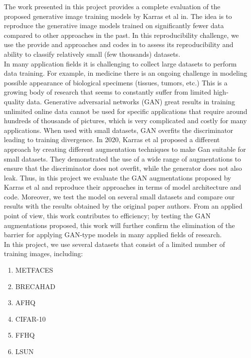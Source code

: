\documentclass{report}
\begin{document}
The work presented in this project provides a complete evaluation of the proposed generative image training models by Karras et al in\cite{karras2020training}. The idea is to reproduce the generative image models trained on significantly fewer data compared to other approaches in the past. In this reproducibility challenge, we use the provide and approaches and codes in\cite{karras2020training} to assess its reproducibility and ability to classify relatively small (few thousands) datasets.\\


In many application fields it is challenging to collect large datasets to perform data training. For example, in medicine there is an ongoing challenge in modeling possible appearance of biological specimens (tissues, tumors, etc.) This is a growing body of research that seems to constantly suffer from limited high-quality data. Generative adversarial networks (GAN) great results in training unlimited online data\cite{goodfellow2014generative, miyato2018cgans, miyato2018spectral, brock2018large, karras2017progressive, karras2019style, karras2020analyzing} cannot be used for specific applications that require around hundreds of thousands of pictures, which is very complicated and costly for many applications. When used with small datasets, GAN overfits the discriminator leading to training divergence. In 2020, Karras et al proposed a different approach by creating different augmentation techniques to make Gan suitable for small datasets. They demonstrated the use of a wide range of augmentations to ensure that the discriminator does not overfit, while the generator does not also leak. Thus, in this project we evaluate the GAN augmentations proposed by Karras et al and reproduce their approaches in terms of model architecture and code. Moreover, we test the model on several small datasets and compare our results with the results obtained by the original paper authors. From an applied point of view, this work contributes to efficiency; by testing the GAN augmentations proposed, this work will further confirm the elimination of the barrier for applying GAN-type
models in many applied fields of research. \\

In this project, we use several datasets that consist of a limited number of training images, including: 
\begin{enumerate}
\item METFACES\cite{karras2020training} 
\item BRECAHAD\cite{aksac2019brecahad}
\item AFHQ\cite{choi2020stargan}
\item CIFAR-10\cite{krizhevsky2009learning}
\item FFHQ\cite{karras2019style}
\item LSUN\cite{yu2015lsun}
\end{enumerate}
\end{document}
